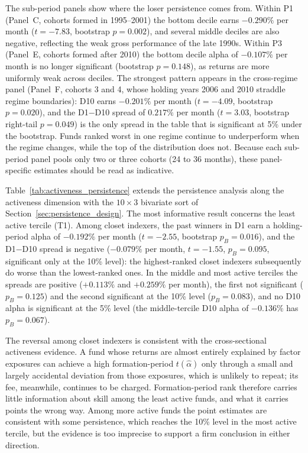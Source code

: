 \documentclass[12pt, oneside]{report}
\begin{document}
The sub-period panels show where the loser persistence comes from. Within
P1 (Panel~C, cohorts formed in 1995--2001) the bottom decile earns
$-0.290\%$ per month ($t = -7.83$, bootstrap $p = 0.002$), and several
middle deciles are also negative, reflecting the weak gross performance of
the late 1990s. Within P3 (Panel~E, cohorts formed after 2010) the bottom
decile alpha of $-0.107\%$ per month is no longer significant
(bootstrap $p = 0.148$), as returns are more uniformly weak across
deciles. The strongest pattern appears in the cross-regime panel
(Panel~F, cohorts 3 and 4, whose holding years 2006 and 2010 straddle
regime boundaries): D10 earns $-0.201\%$ per month ($t = -4.09$, bootstrap
$p = 0.020$), and the D1$-$D10 spread of $0.217\%$ per month ($t = 3.03$,
bootstrap right-tail $p = 0.049$) is the only spread in the table that is
significant at 5\% under the bootstrap. Funds ranked worst in one regime
continue to underperform when the
regime changes, while the top of the distribution does not. Because each
sub-period panel pools only two or three cohorts (24 to 36 months), these
panel-specific estimates should be read as indicative.



Table~\ref{tab:activeness_persistence} extends the persistence analysis
along the activeness dimension with the $10 \times 3$ bivariate sort of
Section~\ref{sec:persistence_design}. The most informative result concerns the least active
tercile (T1). Among closet indexers, the past winners in D1 earn a
holding-period alpha of $-0.192\%$ per month ($t = -2.55$, bootstrap
$p_B = 0.016$), and the D1$-$D10 spread is negative ($-0.079\%$ per
month, $t = -1.55$, $p_B = 0.095$, significant only at the 10\% level):
the highest-ranked closet indexers subsequently do worse than the
lowest-ranked ones. In the middle and most active terciles the spreads
are positive ($+0.113\%$ and $+0.259\%$ per month), the first not
significant ($p_B = 0.125$) and the second significant at the 10\% level
($p_B = 0.083$), and no D10 alpha is significant at the 5\% level (the
middle-tercile D10 alpha of $-0.136\%$ has $p_B = 0.067$).

The reversal among closet indexers is consistent with the cross-sectional
activeness evidence. A fund whose returns are almost entirely explained
by factor exposures can achieve a high formation-period
$t(\hat{\alpha})$ only through a small and largely accidental deviation
from those exposures, which is unlikely to repeat; its fee, meanwhile,
continues to be charged. Formation-period rank therefore carries little
information about skill among the least active funds, and what it
carries points the wrong way. Among more active funds the point estimates
are consistent with some persistence, which reaches the 10\% level in the
most active tercile, but the evidence is too imprecise to support a firm
conclusion in either direction.
\end{document}
